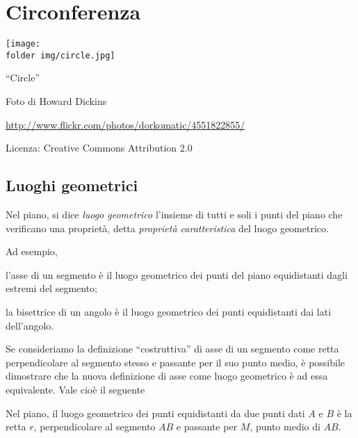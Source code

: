 
\chapter{Circonferenza}\label{chap:circonferenza}

\texttt{[image: \\folder img/circle.jpg]}
  \begin{center}
    {\large ``Circle''}\par
    Foto di Howard Dickins\par
    \url{http://www.flickr.com/photos/dorkomatic/4551822855/}\par
    Licenza: Creative Commons Attribution 2.0\par
  \end{center}
\newpage

\section{Luoghi geometrici}\label{sect:luoghi_geometrici}

\begin{definizione}
Nel piano, si dice \emph{luogo geometrico} l'insieme di tutti e soli 
i punti del piano che verificano una proprietà, detta \emph{proprietà 
caratteristica} del luogo geometrico.
\end{definizione}
Ad esempio,
\begin{itemize*}
\item l'asse di un segmento è il luogo geometrico dei punti del piano 
equidistanti dagli estremi del segmento;
\item la bisettrice di un angolo è il luogo geometrico dei punti 
equidistanti dai lati dell'angolo.
\end{itemize*}
Se consideriamo la definizione ``costruttiva'' di asse di un segmento 
come retta perpendicolare al segmento stesso e passante per il suo 
punto medio, è possibile dimostrare che la nuova definizione di asse 
come luogo geometrico è ad essa equivalente.
Vale cioè il seguente
\begin{teorema}
Nel piano, il luogo geometrico dei punti equidistanti da due punti 
dati $A$ e $B$ è la retta $r$, perpendicolare al segmento $AB$ e 
passante per $M$, punto medio di $AB$.
\end{teorema}

